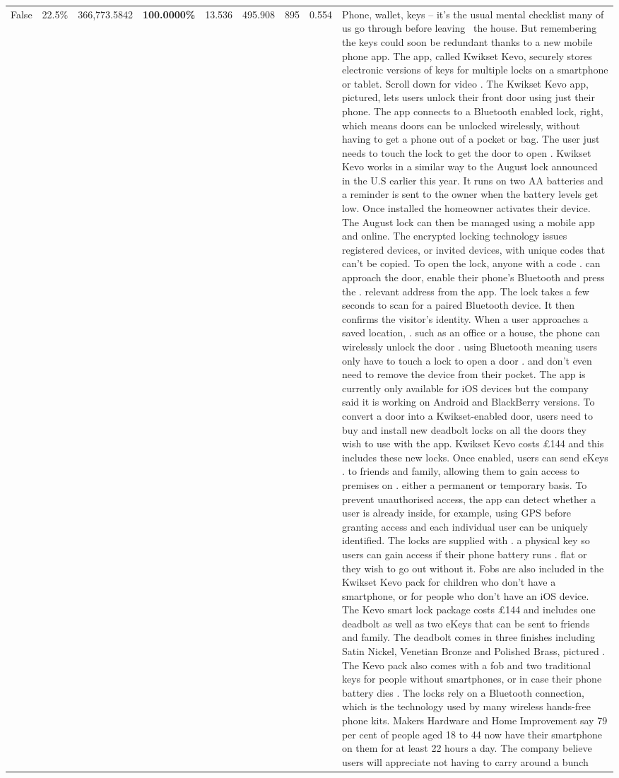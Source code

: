 \begin{table}[H]
\begin{tabular}{lllrlllll}
False & 22.5\% & 366,773.5842 & \bfseries \color{red} 100.0000\% & 13.536 & 495.908 & 895 & 0.554 & Phone, wallet, keys – it’s the usual mental checklist many of us go through before leaving  the house. But remembering the keys could soon be redundant thanks to a new mobile phone app. The app, called Kwikset Kevo, securely stores electronic versions of keys for multiple locks on a smartphone or tablet. Scroll down for video . The Kwikset Kevo app, pictured, lets users unlock their front door using just their phone. The app connects to a Bluetooth enabled lock, right, which means doors can be unlocked wirelessly, without having to get a phone out of a pocket or bag. The user just needs to touch the lock to get the door to open . Kwikset Kevo works in a similar way to the August lock announced in the U.S earlier this year. It runs on two AA batteries and a reminder is sent to the owner when the battery levels get low. Once installed the homeowner activates their device. The August lock can then be managed using a mobile app and online. The encrypted locking technology issues registered devices, or invited devices, with unique codes that can't be copied. To open the lock, anyone with a code . can approach the door, enable their phone's Bluetooth and press the . relevant address from the app. The lock takes a few seconds to scan for a paired Bluetooth device. It then confirms the visitor's identity. When a user approaches a saved location, . such as an office or a house, the phone can wirelessly unlock the door . using Bluetooth meaning users only have to touch a lock to open a door . and don't even need to remove the device from their pocket. The app is currently only available for iOS devices but the company said it is working on Android and BlackBerry versions. To convert a door into a Kwikset-enabled door, users need to buy and install new deadbolt locks on all the doors they wish to use with the app. Kwikset Kevo costs £144 and this includes these new locks. Once enabled, users can send eKeys . to friends and family, allowing them to gain access to premises on . either a permanent or temporary basis. To prevent unauthorised access, the app can detect whether a user is already inside, for example, using GPS before granting access and each individual user can be uniquely identified. The locks are supplied with . a physical key so users can gain access if their phone battery runs . flat or they wish to go out without it. Fobs are also included in the Kwikset Kevo pack for children who don't have a smartphone, or for people who don't have an iOS device. The Kevo smart lock package costs £144 and includes one deadbolt as well as two eKeys that can be sent to friends and family. The deadbolt comes in three finishes including Satin Nickel, Venetian Bronze and Polished Brass, pictured . The Kevo pack also comes with a fob and two traditional keys for people without smartphones, or in case their phone battery dies . The locks rely on a Bluetooth connection, which is the technology used by many wireless hands-free phone kits. Makers Hardware and Home Improvement say 79 per cent of people aged 18 to 44 now have their smartphone on them for at least 22 hours a day. The company believe users will appreciate not having to carry around a bunch 
\end{tabular}
\end{table}
